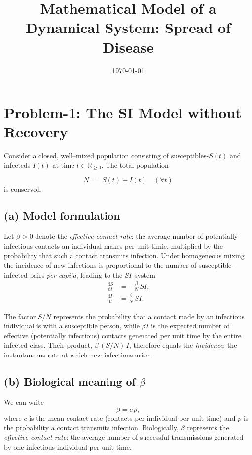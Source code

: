 \documentclass[11pt]{article}
\title{Mathematical Model of a Dynamical System: Spread of Disease}
\date{\today}
\newcommand{\dd}{\,\mathrm{d}}
\newcommand{\R}{\mathbb{R}}
\begin{document}
\maketitle

\section{Problem-1: The SI Model without Recovery}

Consider a closed, well--mixed population consisting of susceptibles-\(S(t)\) and infecteds-\(I(t)\) at time \(t\in\R_{\ge 0}\). The total population

\[
N\;=\;S(t)+I(t)\quad(\forall t)
\]
is conserved.

\subsection*{(a) Model formulation}
Let 
\(\beta>0\) denote the \emph{effective contact rate}: the average number  of potentially infectious contacts an individual makes per unit timie, multiplied by the probability that such a contact transmits infection. Under homogeneous mixing the incidence of new infections is proportional to the number of susceptible--infected pairs \emph{per capita}, leading to the \emph{SI}\ system
\begin{align}
    \frac{\dd S}{\dd t} &= -\frac{\beta}{N}\, S I, \\[4pt]
    \frac{\dd I}{\dd t} &= \frac{\beta}{N}\, S I.
\label{eq:SI}
\end{align}

\noindent
The factor \(S/N\) represents the probability that a contact made by an infectious individual is with a susceptible person, while \(\beta I\) is the expected number of effective (potentially infectious) contacts generated per unit time by the entire infected class. Their product,
\(\beta \,(S/N)\, I\), therefore equals the \emph{incidence}: the instantaneous rate at which new infections arise.

\subsection*{(b) Biological meaning of \(\beta\)}
We can write
\[
\beta = c\,p,
\]
where \(c\) is the mean contact rate (contacts per individual per unit time) and \(p\) is the probability a contact transmits infection. %
Biologically, \(\beta\) represents the \emph{effective contact rate}: the average number of successful transmissions generated by one infectious individual per unit time. 
\end{document}
